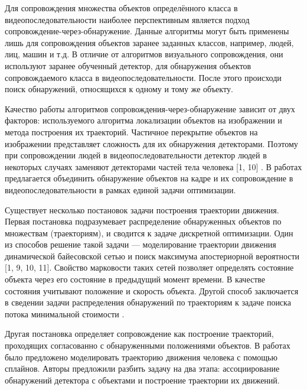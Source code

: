 Для сопровождения множества объектов определённого класса в видеопоследовательности наиболее перспективным является подход сопровождение-через-обнаружение. Данные алгоритмы могут быть применены лишь для сопровождения объектов заранее заданных классов, например, людей, лиц, машин и т.д. В отличие от алгоритмов визуального сопровождения, они используют заранее обученный детектор, для обнаружения объектов сопровождаемого класса в видеопоследовательности. После этого происходи поиск обнаружений, относящихся к одному и тому же объекту.

Качество работы алгоритмов сопровождения-через-обнаружение зависит от двух факторов: используемого алгоритма локализации объектов на изображении и метода построения их траекторий. Частичное перекрытие объектов на изображении представляет сложность для их обнаружения детекторами. Поэтому при сопровождении людей в видеопоследовательности детектор людей в некоторых случаях заменяют детекторами частей тела человека [1, 10] \cite{izadinia20122t}. В работах \cite{wu2012coupling,yan2012track} предлагается объединить обнаружение объектов на кадре и их сопровождение в видеопоследовательности в рамках единой задачи оптимизации.

Существует несколько постановок задачи построения траектории движения. Первая постановка подразумевает распределение обнаруженных объектов по множествам (траекториям), и сводится к задаче дискретной оптимизации. Один из способов решение такой задачи --- моделирование траектории движения динамической байесовской сетью и поиск максимума апостериорной вероятности [1, 9, 10, 11]. Свойство марковости таких сетей позволяет определять состояние объекта через его состояние в предыдущий момент времени. В качестве состояния учитывают положение и скорость объекта. Другой способ заключается в сведении задачи распределения обнаружений по траекториям к задаче поиска потока минимальной стоимости \cite{leal2011everybody,butt2013multi}.

Другая постановка определяет сопровождение как построение траекторий, проходящих согласованно с обнаруженными положениями объектов. В работах \cite{andriyenko2012discrete,milan2013detection} было предложено моделировать траекторию движения человека с помощью сплайнов. Авторы предложили разбить задачу на два этапа: ассоциирование обнаружений детектора с объектами и построение траектории их движений.


